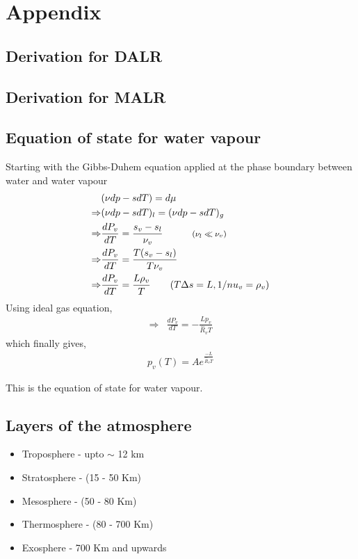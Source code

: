 \documentclass[11pt,a4paper]{article}
\begin{document}
\section{Appendix}
\subsection{Derivation for DALR}
\subsection{Derivation for MALR}
\subsection{Equation of state for water vapour}
Starting with the Gibbs-Duhem equation applied at the phase boundary between water and water vapour
\begin{align*}
&(\nu dp - s dT) = d\mu \\
\Rightarrow &(\nu dp - s dT)_l = (\nu dp - s dT)_g \\
\Rightarrow &\frac{dP_{v}}{dT} = \frac{s_v - s_l}{\nu_v} \quad \quad \quad \text{\footnotesize{$(\nu_l \ll \nu_v)$}} \\
\Rightarrow &\frac{dP_{v}}{dT} = \frac{T(s_v - s_l)}{T \nu_v} \\
\Rightarrow &\frac{dP_{v}}{dT} = \frac{L \rho_v}{T} \quad \quad (T\Delta s = L, 1/nu_v = \rho_v) \\
\end{align*}
Using ideal gas equation, 
\begin{align*}
\Rightarrow &\frac{dP_{v}}{dT} = -\frac{L p_v}{\hat{R}_v T}
\end{align*}
which finally gives,
\begin{align*}
p_v(T) = A e^{\frac{-L}{\hat{R}_v T}}
\end{align*}

This is the equation of state for water vapour.

\subsection{Layers of the atmosphere}
\begin{itemize}
\item Troposphere - upto $\sim$ 12 km
\item Stratosphere - (15 - 50 Km)
\item Mesosphere - (50 - 80 Km)
\item Thermosphere - (80 - 700 Km)
\item Exosphere - 700 Km and upwards
\end{itemize}
\end{document}
